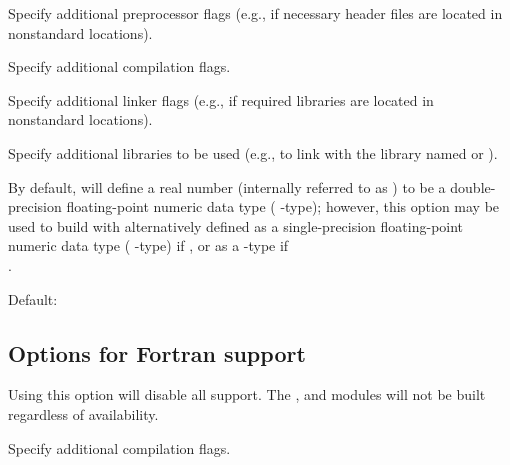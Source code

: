 \begin{config}
  Specify additional {\C} preprocessor flags 
  (e.g.,  if necessary header files are located in nonstandard locations).

\item {}

  Specify additional {\C} compilation flags.

\item {}

  Specify additional linker flags 
  (e.g.,  if required libraries are located in nonstandard locations).

\item {}

  Specify additional libraries to be used 
  (e.g.,  to link with the library named  or ).

\item {}

  By default, {\sundials} will define a real number (internally referred to as
  ) to be a double-precision floating-point numeric data type (
  {\C}-type); however, this option may be used to build {\sundials} with 
  alternatively defined as a single-precision floating-point numeric data type
  ( {\C}-type) if , or as a  {\C}-type
  if \\ .

  Default: 

\end{config}


\subsection*{Options for Fortran support}

\begin{config}

\item {}

  Using this option will disable all {\F} support. The {\fcvode}, {\fkinsol} and
  {\fnvector} modules will not be built regardless of availability.

\item {}

  Specify additional {\F} compilation flags.

\end{config}

